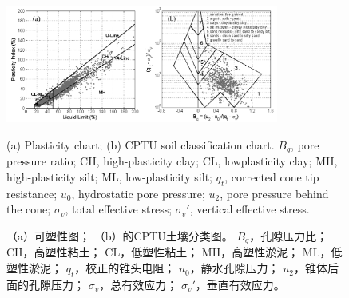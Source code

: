\begin{figure}[htb]
    \centering
    \includegraphics[width=0.8\textwidth]{figures/figure-1.png}
    \caption{(a) Plasticity chart; (b) \citet{Robertson1990151} CPTU soil classification chart. $B_q$, pore pressure ratio; CH, high-plasticity clay; CL, lowplasticity clay; MH, high-plasticity silt; ML, low-plasticity silt; $q_t$, corrected cone tip resistance; $u_0$, hydrostatic pore pressure; $u_2$, pore pressure behind the cone; $\sigma_v$, total effective stress; $\sigma_v'$, vertical effective stress.}
    \addtocounter{figure}{-1}
    \vspace{-5pt}
    \renewcommand{\figurename}{图}
    \caption{（a）可塑性图； （b）\citet{Robertson1990151}的CPTU土壤分类图。 $B_q$，孔隙压力比； CH，高塑性粘土； CL，低塑性粘土； MH，高塑性淤泥； ML，低塑性淤泥； $q_t$，校正的锥头电阻； $u_0$，静水孔隙压力； $u_2$，锥体后面的孔隙压力； $\sigma_v$，总有效应力； $\sigma_v'$，垂直有效应力。}
    \renewcommand{\figurename}{Figure}
    \label{figure:1}
\end{figure}